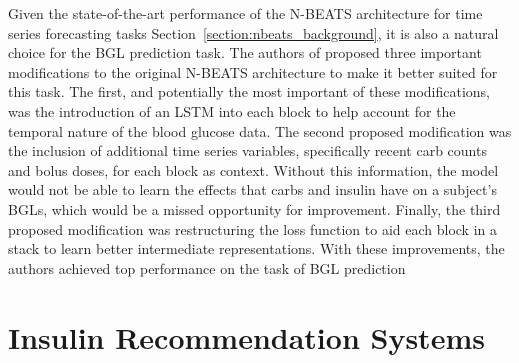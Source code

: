 
Given the state-of-the-art performance of the \ac{N-BEATS} architecture for time series forecasting tasks Section~\ref{section:nbeats_background}, it is also a natural choice for the \ac{BGL} prediction task. The authors of \cite{rubin_falcone:nbeats_bgl} proposed three important modifications to the original \ac{N-BEATS} architecture to make it better suited for this task. The first, and potentially the most important of these modifications, was the introduction of an \ac{LSTM} into each block to help account for the temporal nature of the blood glucose data. The second proposed modification was the inclusion of additional time series variables, specifically recent carb counts and bolus doses, for each block as context. Without this information, the model would not be able to learn the effects that carbs and insulin have on a subject’s \ac{BGLs}, which would be a missed opportunity for improvement. Finally, the third proposed modification was restructuring the loss function to aid each block in a stack to learn better intermediate representations. With these improvements, the authors achieved top performance on the task of \ac{BGL} prediction \cite{kdh-2020-proceedings}



\section{Insulin Recommendation Systems}

